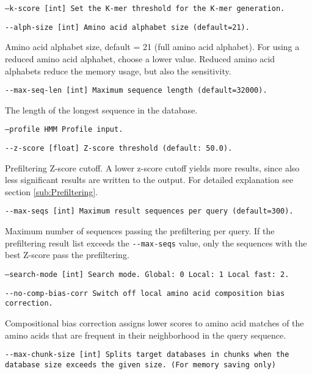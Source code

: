 \documentclass[11pt,a4paper]{scrreprt}
\begin{document}
\texttt{\small --k-score {[}int{]}  Set the K-mer threshold for the K-mer generation.}{\small \par}

\texttt{\small -{}-alph-size {[}int{]} Amino acid alphabet size (default=21).}{\small \par}

Amino acid alphabet size, default = 21 (full amino acid alphabet). For using a reduced amino acid alphabet, choose a lower value. Reduced amino acid alphabets reduce the memory usage, but also the sensitivity.

\texttt{\small -{}-max-seq-len {[}int{]} Maximum sequence length (default=32000).}{\small \par}

The length of the longest sequence in the database.

\texttt{\small --profile HMM Profile input.}{\small \par}

\texttt{\small -{}-z-score {[}float{]} Z-score threshold (default: 50.0).}{\small \par}

Prefiltering Z-score cutoff. A lower z-score cutoff yields more results, since also less significant results are written to the output. For detailed explanation see section \ref{sub:Prefiltering}.

\texttt{\small -{}-max-seqs {[}int{]} Maximum result sequences per query (default=300).}{\small \par}

Maximum number of sequences passing the prefiltering per query. If the prefiltering result list exceeds the \texttt{-{}-max-seqs} value, only the sequences with the best Z-score pass the prefiltering.

\texttt{\small --search-mode {[}int{]}  Search mode. Global: 0 Local: 1 Local fast: 2.}{\small \par}

\texttt{\small -{}-no-comp-bias-corr Switch off local amino acid composition bias correction.}{\small \par}

Compositional bias correction assigns lower scores to amino acid matches of the amino acids that are frequent in their neighborhood in the query sequence.

\texttt{\small -{}-max-chunk-size {[}int{]} Splits target databases in chunks when the database size exceeds the given size. (For memory saving only)}{\small \par}
\end{document}
